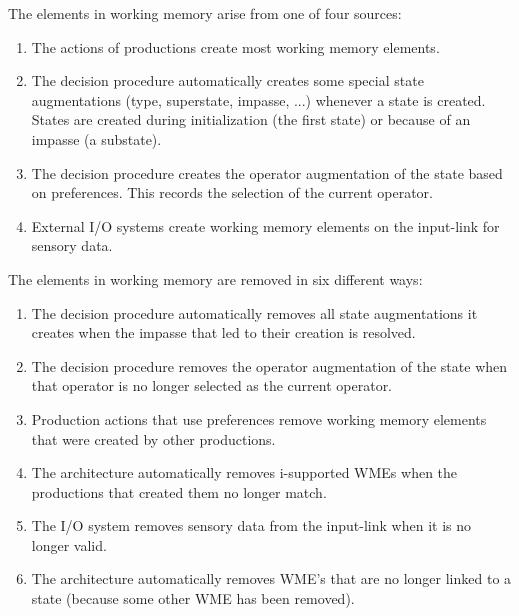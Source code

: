 The elements in working memory arise from one of four sources:\vspace{-12pt}
\begin{enumerate}
\item The actions of productions create most working memory elements. 
\vspace{-8pt}
\item The decision procedure automatically creates some special 
   state augmentations (type, superstate, impasse, ...)
	whenever a state is created.  States are created during 
	initialization (the first state) or because of an impasse (a 
substate).  \vspace{-8pt}
\item The decision procedure creates the operator augmentation of the state 
based on
preferences.  This records the selection of the current operator.\vspace{-8pt}
\item External I/O systems create working memory elements on the input-link
for sensory data.
\end{enumerate}

The elements in working memory are removed in six different ways:\vspace{-12pt}
\begin{enumerate}
\item The decision procedure automatically removes all state
augmentations it creates when the impasse that led to their creation is 
resolved.\vspace{-8pt}
\item The decision procedure removes the operator augmentation of the
state when that operator is no longer selected as the current operator.\vspace{-
8pt}
\item Production actions that use  preferences remove
      working memory elements that were created by other productions.\vspace{-8pt}
\item The architecture automatically removes i-supported WMEs when the productions that created them no longer match.\vspace{-8pt}
\item The I/O system removes sensory data from the input-link when it
is no longer valid. \vspace{-8pt}
\item The architecture automatically removes WME's that are no longer linked to 
a state (because some other WME has been removed).
\end{enumerate}


